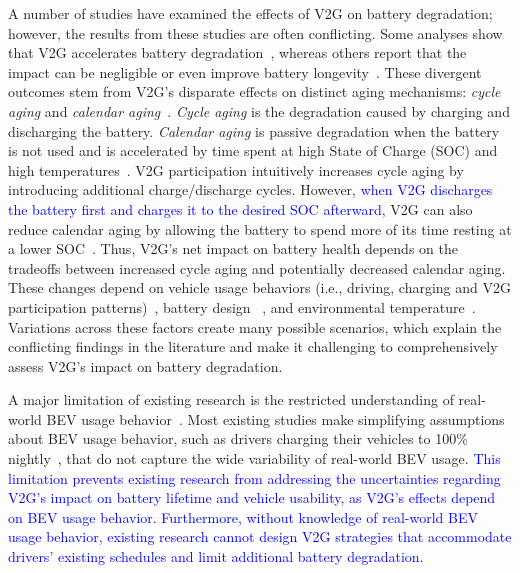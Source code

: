\documentclass[pdflatex,sn-nature]{sn-jnl}%
\theoremstyle{thmstyleone}%
\theoremstyle{thmstyletwo}%
\theoremstyle{thmstylethree}%
\begin{document}
A number of studies have examined the effects of V2G on battery degradation; however, the results from these studies are often conflicting. Some analyses show that V2G accelerates battery degradation~\cite{Thingvad2021, Dubarry2017, wang2016_V2G_impact_degradation, Bishop2013}, whereas others report that the impact can be negligible or even improve battery longevity~\cite{baure_V2G_neglible_impact_V2G, Uddin2018, Wei2022,Gong2024}. These divergent outcomes stem from V2G's disparate effects on distinct aging mechanisms: \emph{cycle aging} and \emph{calendar aging}~\cite{Hamid_V2G}. \emph{Cycle aging} is the degradation caused by charging and discharging the battery. \emph{Calendar aging} is passive degradation when the battery is not used and is accelerated by time spent at high State of Charge (SOC) and high temperatures~\cite{gasper2023degradation}. V2G participation intuitively increases cycle aging by introducing additional charge/discharge cycles. However, \textcolor{blue}{when V2G discharges the battery first and charges it to the desired SOC afterward}, V2G can also reduce calendar aging by allowing the battery to spend more of its time resting at a lower SOC~\cite{Hamid_V2G, Uddin2018}. Thus, V2G's net impact on battery health depends on the tradeoffs between increased cycle aging and potentially decreased calendar aging. These changes depend on vehicle usage behaviors (i.e., driving, charging and V2G participation patterns)~\cite{uddin2017, Wei2022}, battery design ~\cite{petit2016, Kim2022, Leippi2022}, and environmental temperature~\cite{Hamid_V2G, Guo2019, Thingvad2021}. Variations across these factors create many possible scenarios, which explain the conflicting findings in the literature and make it challenging to comprehensively assess V2G's impact on battery degradation.


A major limitation of existing research is the restricted understanding of real-world BEV usage behavior~\cite{yang_2024, Methodology2023, shariff2019state}. Most existing studies make simplifying assumptions about BEV usage behavior, such as drivers charging their vehicles to 100\% nightly~\cite{Uddin2018}, that do not capture the wide variability of real-world BEV usage. \textcolor{blue}{This limitation prevents existing research from addressing the uncertainties regarding V2G's impact on battery lifetime and vehicle usability, as V2G’s effects depend on BEV usage behavior.  Furthermore, without knowledge of real-world BEV usage behavior, existing research cannot design V2G strategies that accommodate drivers' existing schedules and limit additional battery degradation.}
\end{document}
